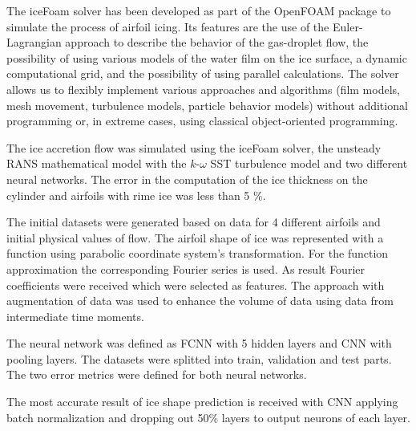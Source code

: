 \documentclass[aerospace,article,submit,moreauthors,pdftex]{Definitions/mdpi}
\begin{document}
The iceFoam solver has been developed as part of the OpenFOAM package to simulate the process of airfoil icing. Its features are the use of the Euler-Lagrangian approach to describe the behavior of the gas-droplet flow, the possibility of using various models of the water film on the ice surface, a dynamic computational grid, and the possibility of using parallel calculations. The solver allows us to flexibly implement various approaches and algorithms (film models, mesh movement, turbulence models, particle behavior models) without additional programming or, in extreme cases, using classical object-oriented programming. 

The ice accretion flow was simulated using the iceFoam solver, the unsteady RANS mathematical model with the $k\text{-}\omega$ SST turbulence model and two different neural networks. 
The error in the computation of the ice thickness on the cylinder and airfoils with rime ice was less than 5 \%.

The initial datasets were generated based on data for 4 different airfoils and initial physical values of flow. The airfoil shape of ice was represented with a function using parabolic coordinate system's transformation. For the function approximation the corresponding Fourier series is used. As result Fourier coefficients  were received  which were selected as features. The approach with augmentation of data was used to enhance the volume of data using data from intermediate time moments. 

The neural network was defined as FCNN with 5 hidden layers and CNN with pooling layers. The datasets were splitted into train, validation and test parts. The two error metrics were defined for both neural networks. 

The most accurate result of ice shape prediction is received with CNN applying batch normalization and dropping out 50\% layers to output neurons of each layer.



\vspace{6pt} 

\end{document}
